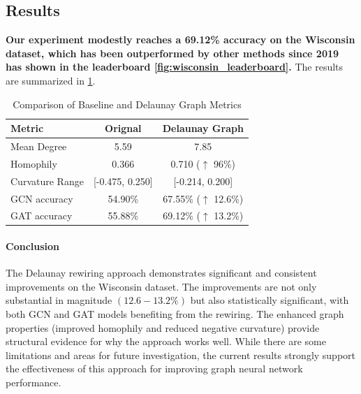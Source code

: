 \documentclass{article}
\theoremstyle{plain}
\theoremstyle{definition}
\theoremstyle{remark}
\begin{document}
\subsection{Results}
\textbf{Our experiment modestly reaches a 69.12\% accuracy on the Wisconsin dataset,
which has been outperformed by other methods since 2019 has shown in the leaderboard \cref{fig:wisconsin_leaderboard}.}
The results are summarized in \cref{tab:graph_comparison}.
\begin{table}[h!]
    \caption{Comparison of Baseline and Delaunay Graph Metrics}
    \centering
    \begin{tabular}{|l|c|c|}
    \hline
    \textbf{Metric}          & \textbf{Orignal} & \textbf{Delaunay Graph} \\ \hline
    Mean Degree              & 5.59                   & 7.85               \\ \hline
    Homophily                & 0.366                  & 0.710 ($\uparrow$ 96\%) \\ \hline
    Curvature Range          & [-0.475, 0.250]        & [-0.214, 0.200]         \\ \hline
    GCN accuracy             & 54.90\%                & 67.55\% ($\uparrow$ 12.6\%)       \\ \hline
    GAT accuracy             & 55.88\%                & 69.12\% ($\uparrow$ 13.2\%)       \\ \hline
    \end{tabular}
    \label{tab:graph_comparison}
    \end{table}


\paragraph{Conclusion}
The Delaunay rewiring approach demonstrates significant and consistent improvements
 on the Wisconsin dataset. The improvements are not only substantial in magnitude 
 $(12.6-13.2\%)$ but also statistically significant, with both GCN and GAT models
 benefiting from the rewiring. The enhanced graph properties (improved homophily 
 and reduced negative curvature) provide structural evidence for why the approach 
 works well. While there are some limitations and areas for future investigation, 
 the current results strongly support the effectiveness of this approach for 
 improving graph neural network performance.

\end{document}
